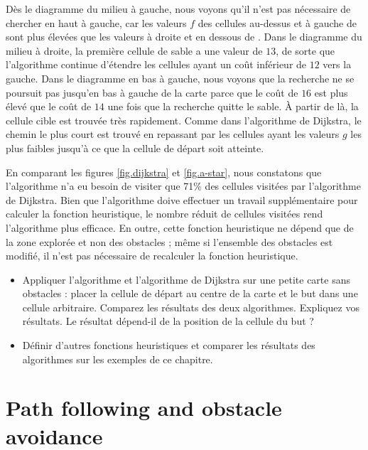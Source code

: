 Dès le diagramme du milieu à gauche, nous voyons qu'il n'est pas nécessaire de chercher en haut à gauche, car les valeurs $f$ des cellules au-dessus et à gauche de  sont plus élevées que les valeurs à droite et en dessous de . Dans le diagramme du milieu à droite, la première cellule de sable a une valeur de $13$, de sorte que l'algorithme continue d'étendre les cellules ayant un coût inférieur de $12$ vers la gauche. Dans le diagramme en bas à gauche, nous voyons que la recherche ne se poursuit pas jusqu'en bas à gauche de la carte parce que le coût de $16$ est plus élevé que le coût de $14$ une fois que la recherche quitte le sable. À partir de là, la cellule cible  est trouvée très rapidement. Comme dans l'algorithme de Dijkstra, le chemin le plus court est trouvé en repassant par les cellules ayant les valeurs $g$ les plus faibles jusqu'à ce que la cellule de départ soit atteinte.

En comparant les figures \ref{fig.dijkstra} et \ref{fig.a-star}, nous constatons que l'algorithme \astar{} n'a eu besoin de visiter que 71\% des cellules visitées par l'algorithme de Dijkstra. Bien que l'algorithme \astar{} doive effectuer un travail supplémentaire pour calculer la fonction heuristique, le nombre réduit de cellules visitées rend l'algorithme plus efficace. En outre, cette fonction heuristique ne dépend que de la zone explorée et non des obstacles ; même si l'ensemble des obstacles est modifié, il n'est pas nécessaire de recalculer la fonction heuristique.

\begin{framed}
\begin{itemize}
\item Appliquer l'algorithme \astar{} et l'algorithme de Dijkstra sur une petite carte sans obstacles : placer la cellule de départ au centre de la carte et le but dans une cellule arbitraire. Comparez les résultats des deux algorithmes. Expliquez vos résultats. Le résultat dépend-il de la position de la cellule du but ?
\item Définir d'autres fonctions heuristiques et comparer les résultats des algorithmes \astar{} sur les exemples de ce chapitre.
\end{itemize}
\end{framed}

\section{Path following and obstacle avoidance}\label{s.path-and-obstacle}

